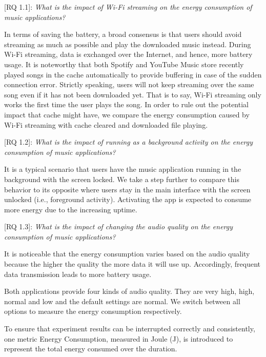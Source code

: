 [RQ 1.1]: \emph{What is the impact of Wi-Fi streaming on the energy consumption of music applications?}

In terms of saving the battery, a broad consensus is that users should avoid streaming as much as possible and play the downloaded music instead. During Wi-Fi streaming, data is exchanged over the Internet, and hence, more battery usage. It is noteworthy that both Spotify and YouTube Music store recently played songs in the cache automatically to provide buffering in case of the sudden connection error. Strictly speaking, users will not keep streaming over the same song even if it has not been downloaded yet. {\color{blue}That is to say, Wi-Fi streaming only works the first time the user plays the song. In order to rule out the potential impact that cache might have, we compare the energy consumption caused by Wi-Fi streaming with cache cleared and downloaded file playing. 
} 

[RQ 1.2]: \emph{What is the impact of running as a background activity on the energy consumption of music applications?}

It is a typical scenario that users have the music application running in the background with the screen locked. We take a step further to compare this behavior to its opposite where users stay in the main interface with the screen unlocked (i.e., foreground activity). Activating the app is expected to consume more energy due to the increasing uptime.

[RQ 1.3]: \emph{What is the impact of changing the audio quality on the energy consumption of music applications?}

 It is noticeable that the energy consumption varies based on the audio quality because the higher the quality the more data it will use up. Accordingly, frequent data transmission leads to more battery usage. {\color{blue}Both applications provide four kinds of audio quality. They are very high, high, normal and low and the default settings are normal. We switch between all options to measure the energy consumption respectively. 
 
To ensure that experiment results can be interrupted correctly and consistently, one metric Energy Consumption, measured in Joule (J), is introduced to represent the total energy consumed over the duration. 
} 





